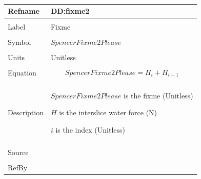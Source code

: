 \documentclass[12pt]{article}
\begin{document}
~\newline
 \noindent \begin{minipage}{\textwidth}
\begin{tabular}{p{} p{}}
\toprule \textbf{Refname} & \textbf{DD:fixme2}
\label{DD:fixme2}
\\ \midrule \\
Label & Fixme
        \\ \midrule \\
        Symbol & $SpencerFixme2Please$
                 \\ \midrule \\
                 Units & Unitless
                         \\ \midrule \\
                         Equation & \begin{displaymath}
                                    SpencerFixme2Please=H_{i}+H_{i-1}
                                    \end{displaymath}
                                    \\ \midrule \\
                                    Description & \begin{symbDescription}
                                                  \item{$SpencerFixme2Please$ is the fixme (Unitless)}
                                                  \item{$H$ is the interslice water force (N)}
                                                  \item{$i$ is the index (Unitless)}
                                                  \end{symbDescription}
                                                  \\ \midrule \\
                                                  Source & \\ \midrule \\
                                                           RefBy & 
\\ \bottomrule \end{tabular}
\end{minipage}\\
\end{document}
